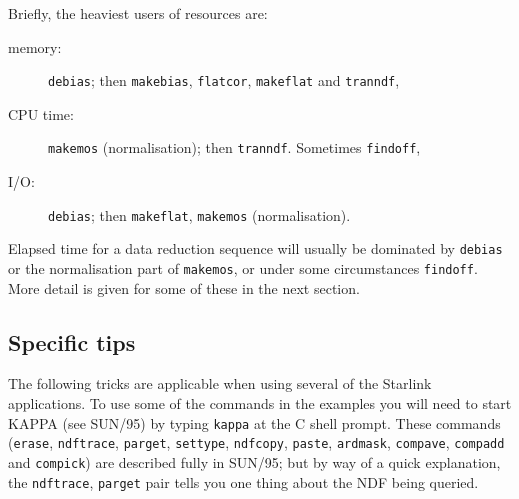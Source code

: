\documentclass[twoside,11pt]{article}
\newcommand{\xref}[3]{#1}
\newcommand{\xlabel}[1]{}
\begin{document}
Briefly, the heaviest users of resources are:

\begin{description}

  \item[memory:] {\tt debias}; then {\tt makebias}, {\tt flatcor},
   {\tt makeflat} and {\tt tranndf},

  \item[CPU time:] {\tt makemos} (normalisation); then {\tt tranndf}.
   Sometimes {\tt findoff},

  \item[I/O:] {\tt debias}; then {\tt makeflat}, {\tt makemos}
   (normalisation).

\end{description}

Elapsed time for a data reduction sequence will usually be dominated by
{\tt debias} or the normalisation part of {\tt makemos}, or under some
circumstances {\tt findoff}.
More detail is given for some of these in the next section.

\subsection{\xlabel{LARGE-SPECIFIC}Specific tips}

The following tricks are applicable when using several of the
Starlink applications.  
To use some of the commands in the examples you will need to start KAPPA
(see \xref{SUN/95}{sun95}{}\/\cite{SUN95}) by typing {\tt kappa} at the
C shell prompt.
These commands 
(\xref{{\tt erase}}{sun95}{ERASE},
\xref{{\tt ndftrace}}{sun95}{NDFTRACE},
\xref{{\tt parget}}{sun95}{PARGET},
\xref{{\tt settype}}{sun95}{SETTYPE},
\xref{{\tt ndfcopy}}{sun95}{NDFCOPY},
\xref{{\tt paste}}{sun95}{PASTE},
\xref{{\tt ardmask}}{sun95}{ARDMASK},
\xref{{\tt compave}}{sun95}{COMPAVE},
\xref{{\tt compadd}}{sun95}{COMPADD} and
\xref{{\tt compick}}{sun95}{COMPICK}) 
are described fully in \xref{SUN/95}{sun95}{}; but by way of a quick
explanation, the {\tt ndftrace}, {\tt parget} pair tells you one thing
about the NDF being queried.
\end{document}
